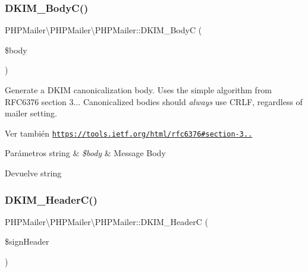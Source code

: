 \subsubsection{\texorpdfstring{D\+K\+I\+M\+\_\+\+Body\+C()}{DKIM\_BodyC()}}
{\footnotesize\ttfamily P\+H\+P\+Mailer\textbackslash{}\+P\+H\+P\+Mailer\textbackslash{}\+P\+H\+P\+Mailer\+::\+D\+K\+I\+M\+\_\+\+BodyC (\begin{DoxyParamCaption}\item[{}]{\$body }\end{DoxyParamCaption})}

Generate a D\+K\+IM canonicalization body. Uses the \textquotesingle{}simple\textquotesingle{} algorithm from R\+F\+C6376 section 3... Canonicalized bodies should {\itshape always} use C\+R\+LF, regardless of mailer setting.

\begin{DoxySeeAlso}{Ver también}
\href{https://tools.ietf.org/html/rfc6376#section-3.4.3}{\tt https\+://tools.\+ietf.\+org/html/rfc6376\#section-\/3..}
\end{DoxySeeAlso}

\begin{DoxyParams}[1]{Parámetros}
string & {\em \$body} & Message Body\\
\hline
\end{DoxyParams}
\begin{DoxyReturn}{Devuelve}
string 
\end{DoxyReturn}
\mbox{\label{classPHPMailer_1_1PHPMailer_1_1PHPMailer_ad584c404e1d081ed8ba5a019335a606b}} 
\subsubsection{\texorpdfstring{D\+K\+I\+M\+\_\+\+Header\+C()}{DKIM\_HeaderC()}}
{\footnotesize\ttfamily P\+H\+P\+Mailer\textbackslash{}\+P\+H\+P\+Mailer\textbackslash{}\+P\+H\+P\+Mailer\+::\+D\+K\+I\+M\+\_\+\+HeaderC (\begin{DoxyParamCaption}\item[{}]{\$sign\+Header }\end{DoxyParamCaption})}

